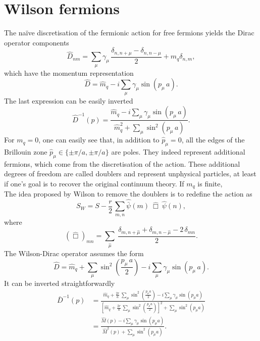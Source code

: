 \chapter{Wilson fermions}
\label{chap:AppendixB}
The na\"ive discretisation of the fermionic action for free fermions yields the Dirac operator components
\begin{equation*}
    \widehat{D}_{nm} = \sum_\mu \gamma_\mu \, \frac{\delta_{n,n+\mu} - \delta_{n,n-\mu}}{2} + m_q \delta_{n,m},
\end{equation*}
which have the momentum representation
\begin{equation*}
    \widehat D = \hat m_q - i \sum_\mu \gamma_\mu \sin \left(p_\mu \, a\right).
\end{equation*}
The last expression can be easily inverted
\begin{equation*}
    \widehat{D}^{-1}(p) = \frac{\hat m_q - i \sum_\mu \gamma_\mu \sin \left(p_\mu \, a\right)}{\hat m_q^2 + \sum_\mu \sin^2 \left(p_\mu \, a \right)}.
\end{equation*}
For $m_q = 0$, one can easily see that, in addition to $\hat{p}_\mu = 0$, all the edges of the Brillouin zone $\hat p_\mu \in \{\pm \pi/a, \pm \pi/a\}$ are poles.
They indeed represent additional fermions, which come from the discretisation of the action. These additional degrees of freedom are called doublers and represent unphysical particles, at least if one's goal is to recover the original continuum theory. 
If $m_q$ is finite,\\
The idea proposed by Wilson to remove the doublers is to redefine the action as
\begin{equation*}
    S_{W} = S - \frac{r}{2} \, \sum_{m,n} \hat{\bar\psi}(m) \ \hat\Box \ \hat{\psi}(n),
\end{equation*}
where 
\begin{equation*}
    \left(\hat\Box\right)_{mn} = \sum_{\hat\mu} \ \frac{\delta_{m, n+\hat\mu} + \delta_{m, n-\hat\mu} - 2 \, \delta_{mn}}{2}.
\end{equation*}
The Wilson-Dirac operator assumes the form
\begin{equation*}
    \widehat D = \hat m_q + \sum_\mu \sin^2\left(\frac{p_\mu \, a}{2}\right) - i \sum_\mu \gamma_\mu \sin \left(p_\mu \, a\right).
\end{equation*}
It can be inverted straightforwardly
\begin{equation*}
    \begin{aligned}
        \bar{D}^{-1}(p) &= \frac{\hat{m}_q + \frac{2r}{a} \, \sum_\mu \sin ^2\left(\frac{p_\mu a}{2}\right) - i \sum_\mu \gamma_\mu \sin \left(p_\mu a\right)}{\left[\hat{m}_q + \frac{2r}{a} \, \sum_\mu \sin^2\left(\frac{p_\mu a}{2}\right)\right]^2 + \sum_\mu \sin^2 \left(p_\mu a\right)} \\
        &= \frac{\hat{M}(p) - i \sum_\mu \gamma_\mu \sin \left(p_\mu a\right)}{\hat{M}^2(p) + \sum_\mu \sin^2 \left(p_\mu a\right)}.
    \end{aligned}
\end{equation*}
